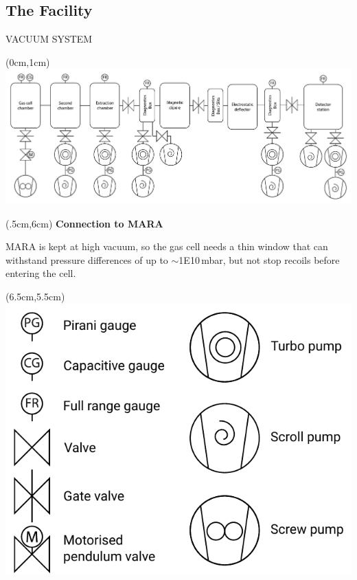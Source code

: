 \documentclass[9pt]{beamer}
\begin{document}
\subsection{The Facility}
\begin{frame}{VACUUM SYSTEM}
    \begin{textblock*}{13cm}(0cm,1cm)
            \centering
            {\includegraphics[scale=0.35]{assets/pumpdia.pdf}}
    \end{textblock*}
    
    \begin{textblock*}{5cm}(.5cm,6cm)
        \centering
        \textbf{Connection to MARA} 
      
      {MARA is kept at high vacuum, so the gas cell needs a thin window that can withstand pressure differences of up to $\sim$1E10\,mbar, but not stop recoils before entering the cell.}
    \end{textblock*}
    
    \begin{textblock*}{6.5cm}(6.5cm,5.5cm)
      \centering
            \includegraphics[scale=0.4]{assets/legend.pdf}
    \end{textblock*}
\end{frame}
\end{document}
